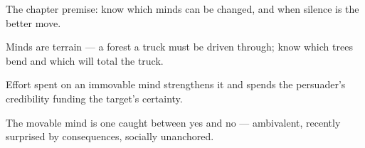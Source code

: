 

\begin{distilled}
  \item The chapter premise: know which minds can be changed, and when silence is the better move.
  \item Minds are terrain --- a forest a truck must be driven through; know which trees bend and which will total the truck.
  \item Effort spent on an immovable mind strengthens it and spends the persuader's credibility funding the target's certainty.
  \item The movable mind is one caught between yes and no --- ambivalent, recently surprised by consequences, socially unanchored.
\end{distilled}
